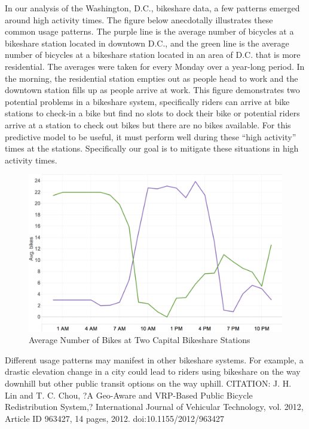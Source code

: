 \documentclass{acm_proc_article-sp}
\begin{document}
In our analysis of the Washington, D.C., bikeshare data, a few patterns emerged around high activity times. The figure below anecdotally illustrates these common usage patterns. The purple line is the average number of bicycles at a bikeshare station located in downtown D.C., and the green line is the average number of bicycles at a bikeshare station located in an area of D.C. that is more residential. The averages were taken for every Monday over a year-long period. In the morning, the residential station empties out as people head to work and the downtown station fills up as people arrive at work. This figure demonstrates two potential problems in a bikeshare system, specifically riders can arrive at bike stations to check-in a bike but find no slots to dock their bike or potential riders arrive at a station to check out bikes but there are no bikes available.  For this predictive model to be useful, it must perform well during these ``high activity'' times at the stations. Specifically our goal is to mitigate these situations in high activity times.

\begin{figure} [!h]
\caption{Average Number of Bikes at Two Capital Bikeshare Stations}
\centering
\includegraphics[scale = 0.35]{stations_over_time.png}
\end{figure}

Different usage patterns may manifest in other bikeshare systems. For example, a drastic elevation change in a city could lead to riders using bikeshare on the way downhill but other public transit options on the way uphill. CITATION: J. H. Lin and T. C. Chou, ?A Geo-Aware and VRP-Based Public Bicycle Redistribution System,? International Journal of Vehicular Technology, vol. 2012, Article ID 963427, 14 pages, 2012. doi:10.1155/2012/963427
\end{document}
